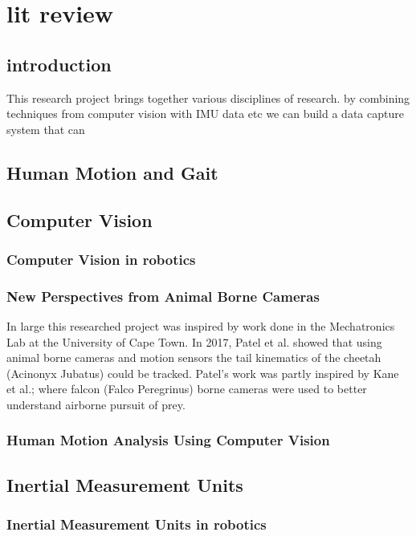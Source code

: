 \chapter{lit review}

\section{introduction}
This research project brings together various disciplines of research. by combining techniques from computer vision with IMU data etc we can build a data capture system that can 

\section{Human Motion and Gait}


\section{Computer Vision} 
\subsection{Computer Vision in robotics}
\subsection{New Perspectives from Animal Borne Cameras}
In large this researched project was inspired by work done in the Mechatronics Lab at the University of Cape Town. In 2017, Patel et al.  \cite{patel2017trackingieee} showed that using animal borne cameras and motion sensors the tail kinematics of the cheetah (Acinonyx Jubatus) could be tracked. Patel's work was partly inspired by Kane et al.;\cite{kane2014falcons} where falcon (Falco Peregrinus) borne cameras were used to better understand airborne pursuit of prey.
\subsection{Human Motion Analysis Using Computer Vision}


\section{Inertial Measurement Units}
\subsection{Inertial Measurement Units in robotics}
